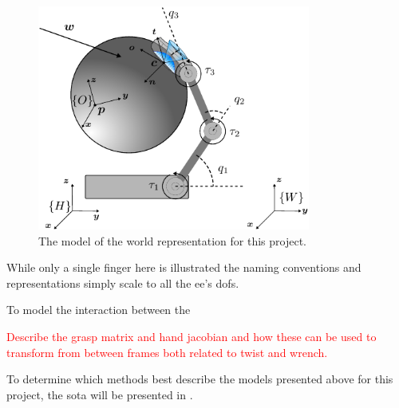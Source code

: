 \begin{figure}[h]
	\begin{small}
		\begin{center}
			\includegraphics[width=0.8\textwidth]{chapters/modeling/fig/test-hand-kinematics-crop.pdf}
		\end{center}
		\caption{The model of the world representation for this project.}
		\label{fig:full-system-model}
	\end{small}
\end{figure}


While only a single finger here is illustrated the naming conventions and representations simply scale to all the \gls{ee}'s \gls{dof}s.\medskip

To model the interaction between the 

\textcolor{red}{Describe the grasp matrix and hand jacobian and how these can be used to transform from between frames both related to twist and wrench.}

To determine which methods best describe the models presented above for this project, the \gls{sota} will be presented in .


